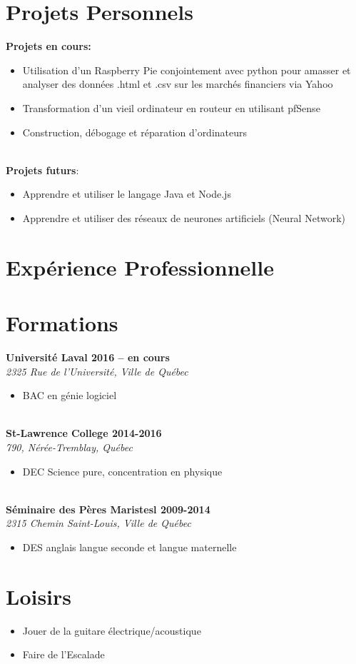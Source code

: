 \documentclass[11pt,a4paper,roman]{moderncv}        %
\begin{document}
\section {Projets Personnels}
{\bfseries Projets en cours:}
\begin{itemize}
\item Utilisation d’un Raspberry Pie conjointement avec python pour amasser et analyser des données .html et .csv sur les marchés financiers via Yahoo
\item Transformation d’un vieil ordinateur en routeur en utilisant pfSense
\item Construction, débogage et réparation d’ordinateurs
\end{itemize}
\hfill\\
{\bfseries Projets futurs}:
\begin{itemize}
\item Apprendre et utiliser le langage Java et Node.js
\item Apprendre et utiliser des réseaux de neurones artificiels (Neural Network)
\end{itemize}

\section{Expérience Professionnelle}

\section {Formations}
{\bfseries Université Laval \hfill 2016 – en cours}\\
\textit {2325 Rue de l'Université, Ville de Québec}
\begin{itemize} \item BAC en génie logiciel \end{itemize}
\hfill\\
{\bfseries St-Lawrence College \hfill 2014-2016}\\
\textit {790, Nérée-Tremblay, Québec}
\begin{itemize} \item DEC Science pure, concentration en physique \end{itemize}
\hfill\\
{\bfseries Séminaire des Pères Maristesl \hfill 2009-2014}\\
\textit {2315 Chemin Saint-Louis, Ville de Québec}
\begin{itemize} \item DES anglais langue seconde et langue maternelle \end{itemize}

\section{Loisirs}
\begin{itemize} 
\item Jouer de la guitare électrique/acoustique
\item Faire de l’Escalade
\end{itemize}
\end{document}
